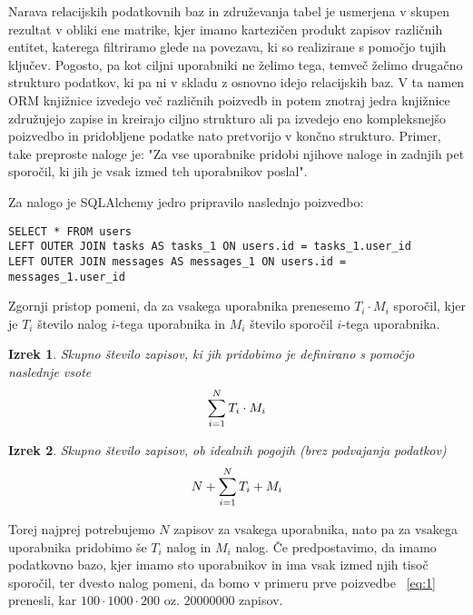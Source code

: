 \documentclass[a4paper,12pt,openright]{book}
\newtheorem{izrek}{Izrek}[chapter]
\begin{document}
    Narava relacijskih podatkovnih baz in združevanja tabel je usmerjena v skupen rezultat v obliki ene matrike, kjer imamo kartezičen produkt zapisov različnih entitet, katerega filtriramo glede na povezava, ki so realizirane s pomočjo tujih ključev. Pogosto, pa kot ciljni uporabniki ne želimo tega, temveč želimo drugačno strukturo podatkov, ki pa ni v skladu z osnovno idejo relacijskih baz. V ta namen ORM knjižnice izvedejo več različnih poizvedb in potem znotraj jedra knjižnice združujejo zapise in kreirajo ciljno strukturo ali pa izvedejo eno kompleksnejšo poizvedbo in pridobljene podatke nato pretvorijo v končno strukturo. Primer, take preproste naloge je: "Za vse uporabnike pridobi njihove naloge in zadnjih pet sporočil, ki jih je vsak izmed teh uporabnikov poslal".

    \noindent
    Za nalogo je SQLAlchemy jedro pripravilo naslednjo poizvedbo:
    \begin{verbatim}
SELECT * FROM users
LEFT OUTER JOIN tasks AS tasks_1 ON users.id = tasks_1.user_id
LEFT OUTER JOIN messages AS messages_1 ON users.id = messages_1.user_id
    \end{verbatim}

    \noindent
    Zgornji pristop pomeni, da za vsakega uporabnika prenesemo $T_i \cdot M_i$ sporočil, kjer je $T_i$ število nalog $i$-tega uporabnika in $M_i$ število sporočil $i$-tega uporabnika.

    \begin{izrek}
        \label{iz:1}
        Skupno število zapisov, ki jih pridobimo je definirano s pomočjo naslednje vsote
        \begin{equation}
            \Large \sum_{i=1}^{N} T_i \cdot M_i
        \label{eq:1}
        \end{equation}
    \end{izrek}

    \begin{izrek}
        \label{iz:2}
        Skupno število zapisov, ob idealnih pogojih (brez podvajanja podatkov)
        \begin{equation}
            \Large N + \sum_{i=1}^{N} T_i + M_i
        \label{eq:2}
        \end{equation}
    \end{izrek}

    \noindent
    Torej najprej potrebujemo $N$ zapisov za vsakega uporabnika, nato pa za vsakega uporabnika pridobimo še $T_i$ nalog in $M_i$ nalog. Če predpostavimo, da imamo podatkovno bazo, kjer imamo sto uporabnikov in ima vsak izmed njih tisoč sporočil, ter dvesto nalog pomeni, da bomo v primeru prve poizvedbe ~\eqref{eq:1} prenesli, kar $100 \cdot 1000 \cdot 200$ oz. $\num{20000000}$ zapisov.
\end{document}
